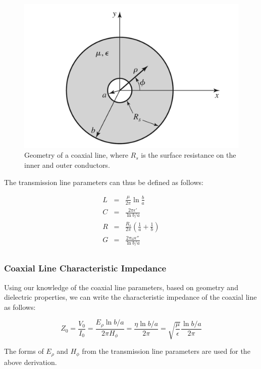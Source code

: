 \documentclass[12pt,onecolumn,titlepage]{article}
\begin{document}
\begin{figure}[htbp]
	\centering
	\includegraphics[width=\textwidth]{Pictures/27May2013/coaxial_geometry}
	\caption{ Geometry of a coaxial line, where $R_s$ is the surface resistance on the inner and outer conductors. } 
	\label{fig:coaxial_geometry}
\end{figure}

The transmission line parameters can thus be defined as follows:

\begin{eqnarray}
L &=& \frac{\mu}{2 \pi} \ln \frac{b}{a} \\
C &=& \frac{2 \pi \epsilon'}{\ln b/a} \\
R &=& \frac{R_s}{2 \pi} \left( \frac{1}{a} + \frac{1}{b} \right) \\
G &=& \frac{2 \pi \omega \epsilon''}{\ln b/a} \\
\end{eqnarray}

\subsubsection{Coaxial Line Characteristic Impedance}
\indent \indent Using our knowledge of the coaxial line parameters, based on geometry and dielectric properties, we can write the characteristic impedance of the coaxial line as follows:

\[ Z_0 = \frac{V_0}{I_0} = \frac{E_\rho \ln b/a}{2 \pi H_\phi} = \frac{\eta \ln b/a}{2 \pi} = \sqrt{ \frac{\mu}{\epsilon}} \frac{\ln b/a }{2 \pi} \]

The forms of $E_\rho$ and $H_\phi$ from the transmission line parameters are used for the above derivation.
\end{document}
